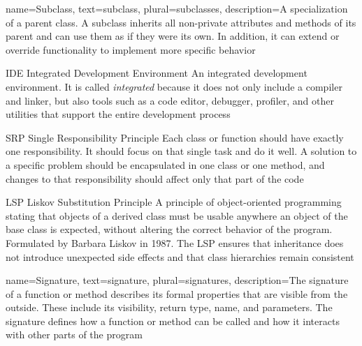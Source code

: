 {
	name={Subclass},
	text={subclass},
	plural={subclasses},
	description={A specialization of a parent class. A subclass inherits all non-private attributes and methods of its parent and can use them as if they were its own. In addition, it can extend or override functionality to implement more specific behavior}
}

	{IDE}            %
	{Integrated Development Environment}  %
	{An integrated development environment. It is called \emph{integrated} because it does not only include a compiler and linker, but also tools such as a code editor, debugger,	profiler, and other utilities that support the entire development process} %

	{SRP}            %
	{Single Responsibility Principle}  %
	{Each class or function should have exactly one responsibility. It should focus on that single task and do it well. A solution to a specific problem should be encapsulated in one class or one method, and changes to that responsibility should affect only that part of the code} %

	{LSP}            %
	{Liskov Substitution Principle}  %
	{A principle of object-oriented programming stating that objects of a derived class must be usable anywhere an object of the base class is expected, without altering the correct behavior of the program. Formulated by Barbara Liskov in 1987. The LSP ensures that inheritance does not introduce unexpected side effects and that class hierarchies remain consistent} %

{
	name={Signature},
	text={signature},
	plural={signatures},
	description={The signature of a function or method describes its formal properties that are visible from the outside. These include its visibility, return type, name, and parameters. 	The signature defines how a function or method can be called and how it interacts with other parts of the program}
}


